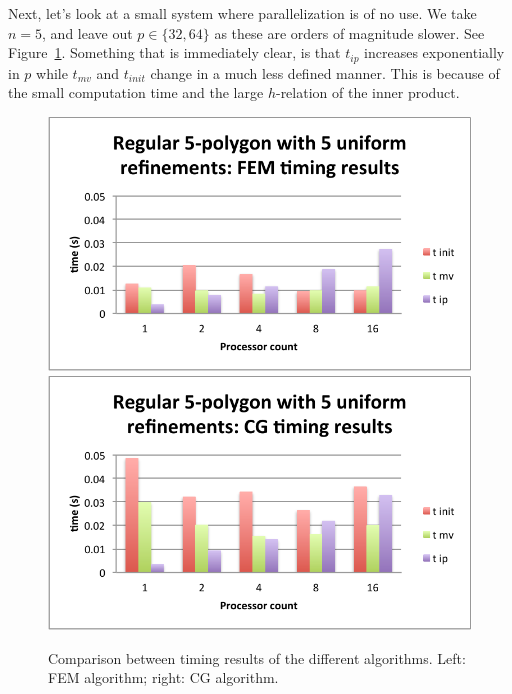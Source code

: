 \documentclass[11pt]{amsart}
\theoremstyle{definition}
\begin{document}
Next, let's look at a small system where parallelization is of no use. We take $n=5$, and leave out $p \in \{32,64\}$ as these are orders of magnitude slower. See Figure~\ref{fig:barchart_oud}. Something that is immediately clear, is that $t_{ip}$ increases exponentially in $p$ while $t_{mv}$ and $t_{init}$ change in a much less defined manner. This is because of the small computation time and the large $h$-relation of the inner product.
\begin{figure}
  \includegraphics[width=0.48\linewidth]{barchart_oud_fem.pdf}
  \includegraphics[width=0.48\linewidth]{barchart_oud_cg.pdf}
  \caption{Comparison between timing results of the different algorithms. Left: FEM algorithm; right: CG algorithm.}
  \label{fig:barchart_oud}
\end{figure}
\end{document}

